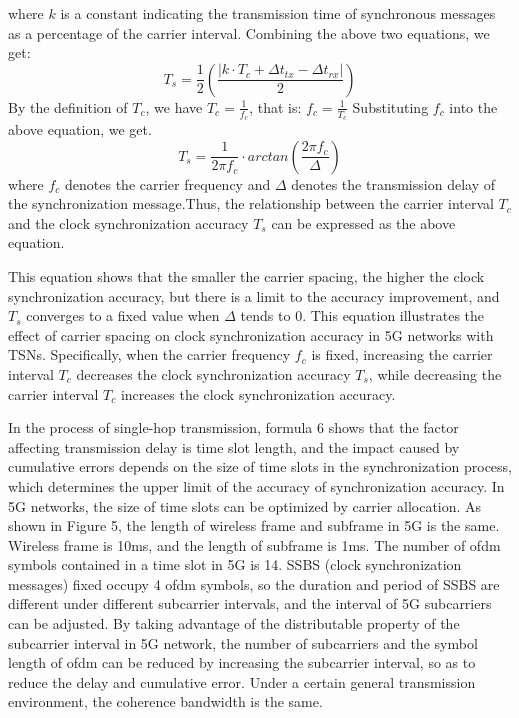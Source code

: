 \documentclass[english]{cccconf}
\begin{document}
where $k$ is a constant indicating the transmission time of synchronous messages as a percentage of the carrier interval.
Combining the above two equations, we get:
\begin{equation}
	T_s = \frac{1}{2}\left(\frac{|k \cdot T_c + \Delta t_{tx} - \Delta t_{rx}|}{2}\right)
\end{equation}
By the definition of $T_c$, we have $T_c = \frac{1}{f_c}$, that is: $f_c = \frac{1}{T_c}$
Substituting $f_c$ into the above equation, we get.
$$T_s = \frac{1}{2\pi f_c}\cdot arctan\left(\frac{2\pi f_c}{\Delta}\right)$$
where $f_c$ denotes the carrier frequency and $\Delta$ denotes the transmission delay of the synchronization message.Thus, the relationship between the carrier interval $T_c$ and the clock synchronization accuracy $T_s$ can be expressed as the above equation. 

This equation shows that the smaller the carrier spacing, the higher the clock synchronization accuracy, but there is a limit to the accuracy improvement, and $T_s$ converges to a fixed value when $\Delta$ tends to 0.
This equation illustrates the effect of carrier spacing on clock synchronization accuracy in 5G networks with TSNs. Specifically, when the carrier frequency $f_c$ is fixed, increasing the carrier interval $T_c$ decreases the clock synchronization accuracy $T_s$, while decreasing the carrier interval $T_c$ increases the clock synchronization accuracy.


In the process of single-hop transmission, formula 6 shows that the factor affecting transmission delay is time slot length, and the impact caused by cumulative errors depends on the size of time slots in the synchronization process, which determines the upper limit of the accuracy of synchronization accuracy. In 5G networks, the size of time slots can be optimized by carrier allocation.
As shown in Figure 5, the length of wireless frame and subframe in 5G is the same. Wireless frame is 10ms, and the length of subframe is 1ms. The number of ofdm symbols contained in a time slot in 5G is 14. SSBS (clock synchronization messages) fixed occupy 4 ofdm symbols, so the duration and period of SSBS are different under different subcarrier intervals, and the interval of 5G subcarriers can be adjusted. By taking advantage of the distributable property of the subcarrier interval in 5G network, the number of subcarriers and the symbol length of ofdm can be reduced by increasing the subcarrier interval, so as to reduce the delay and cumulative error. Under a certain general transmission environment, the coherence bandwidth is the same. 
\end{document}
